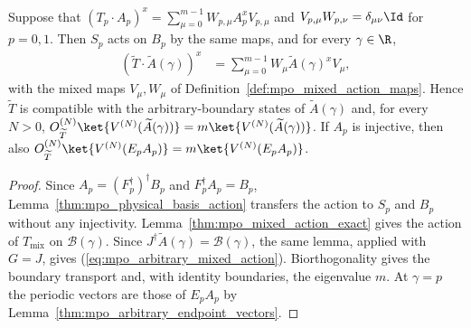 \begin{lemma}
    \label{thm:mpo_arbitrary_mixed_action}
    \leanok
    Suppose that $(T_p\cdot A_p)^x=\sum_{\mu=0}^{m-1}W_{p,\mu}A_p^xV_{p,\mu}$
    and $V_{p,\mu}W_{p,\nu}=\delta_{\mu\nu}\Id$ for $p=0,1$. Then
    $S_p$ acts on $B_p$ by the same maps, and for every $\gamma\in\R$,
    \begin{align}
        (\widetilde T\cdot\widetilde A(\gamma))^x
         & =\sum_{\mu=0}^{m-1}W_\mu\widetilde A(\gamma)^xV_\mu,
        \label{eq:mpo_arbitrary_mixed_action}
    \end{align}
    with the mixed maps $V_\mu,W_\mu$ of
    Definition~\ref{def:mpo_mixed_action_maps}. Hence $\widetilde T$ is
    compatible with the arbitrary-boundary states of $\widetilde A(\gamma)$
    and, for every $N>0$,
    $O^{(N)}_{\widetilde T}\ket{V^{(N)}(\widetilde A(\gamma))}
        =m\ket{V^{(N)}(\widetilde A(\gamma))}$.
    If $A_p$ is injective, then also
    $O^{(N)}_{\widetilde T}\ket{V^{(N)}(E_pA_p)}=m\ket{V^{(N)}(E_pA_p)}$.
\end{lemma}
\begin{proof}
    \leanok
    Since $A_p=(F_p^\dagger)^\dagger B_p$ and $F_p^\dagger A_p=B_p$,
    Lemma~\ref{thm:mpo_physical_basis_action} transfers the action to
    $S_p$ and $B_p$ without any injectivity. Lemma~\ref{thm:mpo_mixed_action_exact}
    gives the action of $T_{\mathrm{mix}}$ on $\mathcal B(\gamma)$.
    Since $J^\dagger\widetilde A(\gamma)=\mathcal B(\gamma)$, the same
    lemma, applied with $G=J$, gives (\ref{eq:mpo_arbitrary_mixed_action}).
    Biorthogonality gives the boundary transport and, with identity
    boundaries, the eigenvalue $m$. At $\gamma=p$ the periodic vectors
    are those of $E_pA_p$ by Lemma~\ref{thm:mpo_arbitrary_endpoint_vectors}.
\end{proof}

